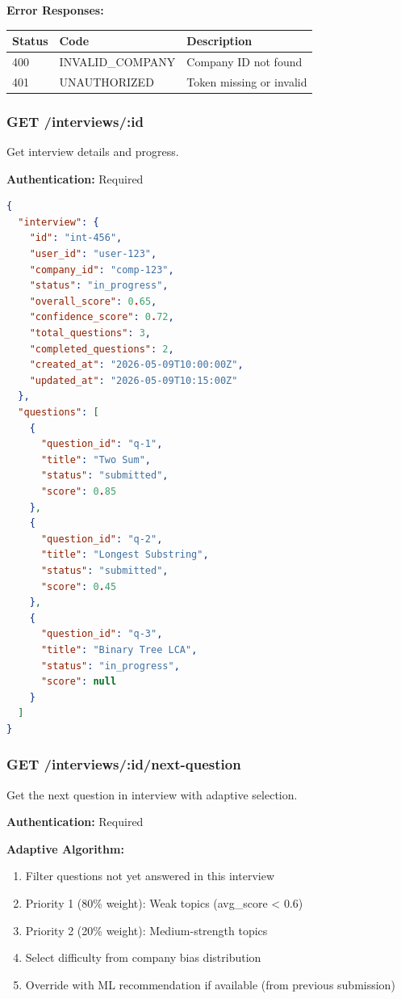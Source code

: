\documentclass[12pt,a4paper,oneside]{article}
\begin{document}
\textbf{Error Responses:}

\begin{table}[H]
\centering
\begin{tabular}{|p{1.8cm}|p{2.8cm}|p{8.4cm}|}
\hline
\textbf{Status} & \textbf{Code} & \textbf{Description} \\
\hline
400 & INVALID\_COMPANY & Company ID not found \\
\hline
401 & UNAUTHORIZED & Token missing or invalid \\
\hline
\end{tabular}
\end{table}

\subsubsection{GET /interviews/:id}

Get interview details and progress.

\textbf{Authentication:} Required

\begin{lstlisting}[language=JSON, caption=Response 200]
{
  "interview": {
    "id": "int-456",
    "user_id": "user-123",
    "company_id": "comp-123",
    "status": "in_progress",
    "overall_score": 0.65,
    "confidence_score": 0.72,
    "total_questions": 3,
    "completed_questions": 2,
    "created_at": "2026-05-09T10:00:00Z",
    "updated_at": "2026-05-09T10:15:00Z"
  },
  "questions": [
    {
      "question_id": "q-1",
      "title": "Two Sum",
      "status": "submitted",
      "score": 0.85
    },
    {
      "question_id": "q-2",
      "title": "Longest Substring",
      "status": "submitted",
      "score": 0.45
    },
    {
      "question_id": "q-3",
      "title": "Binary Tree LCA",
      "status": "in_progress",
      "score": null
    }
  ]
}
\end{lstlisting}

\subsubsection{GET /interviews/:id/next-question}

Get the next question in interview with adaptive selection.

\textbf{Authentication:} Required

\textbf{Adaptive Algorithm:}

\begin{enumerate}
    \item Filter questions not yet answered in this interview
    \item Priority 1 (80\% weight): Weak topics (avg\_score < 0.6)
    \item Priority 2 (20\% weight): Medium-strength topics
    \item Select difficulty from company bias distribution
    \item Override with ML recommendation if available (from previous submission)
\end{enumerate}
\end{document}
